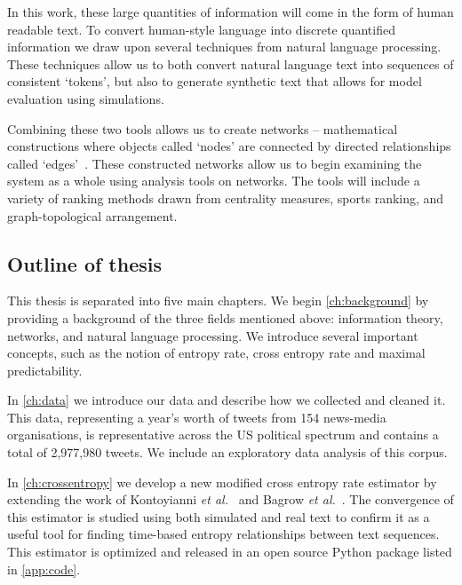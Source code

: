 In this work, these large quantities of information will come in the form of human readable text. To convert human-style language into discrete quantified information we draw upon several techniques from natural language processing. These techniques allow us to both convert natural language text into sequences of consistent `tokens', but also to generate synthetic text that allows for model evaluation using simulations. 

Combining these two tools allows us to create networks -- mathematical constructions where objects called `nodes' are connected by directed relationships called `edges'~\cite{newman_networks_2018}. These constructed networks allow us to begin examining the system as a whole using analysis tools on networks. The tools will include a variety of ranking methods drawn from centrality measures, sports ranking, and graph-topological arrangement.


\subsection{Outline of thesis}



This thesis is separated into five main chapters. We begin \autoref{ch:background} by providing a background of the three fields mentioned above: information theory, networks, and natural language processing. We introduce several important concepts, such as the notion of entropy rate, cross entropy rate and maximal predictability.

In \autoref{ch:data} we introduce our data and describe how we collected and cleaned it. This data, representing a year's worth of tweets from 154 news-media organisations, is representative across the US political spectrum and contains a total of 2,977,980 tweets. We include an exploratory data analysis of this corpus.

In \autoref{ch:crossentropy} we develop a new modified cross entropy rate estimator by extending the work of Kontoyianni \emph{et al.}~\cite{kontoyiannis_nonparametric_1998} and Bagrow \emph{et al.}~\cite{bagrowInformationFlowReveals2019}. The convergence of this estimator is studied using both simulated and real text to confirm it as a useful tool for finding time-based entropy relationships between text sequences. This estimator is optimized and released in an open source Python package listed in \autoref{app:code}.

